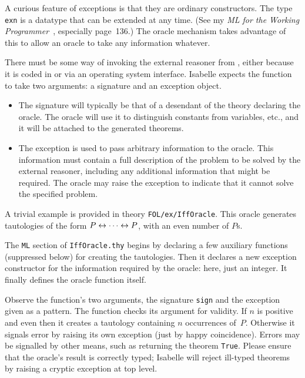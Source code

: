 A curious feature of {\ML} exceptions is that they are ordinary constructors.
The {\ML} type {\tt exn} is a datatype that can be extended at any time.  (See
my {\em {ML} for the Working Programmer}~\cite{paulson-ml2}, especially
page~136.)  The oracle mechanism takes advantage of this to allow an oracle to
take any information whatever.

There must be some way of invoking the external reasoner from \ML, either
because it is coded in {\ML} or via an operating system interface.  Isabelle
expects the {\ML} function to take two arguments: a signature and an
exception object.
\begin{itemize}
\item The signature will typically be that of a desendant of the theory
  declaring the oracle.  The oracle will use it to distinguish constants from
  variables, etc., and it will be attached to the generated theorems.

\item The exception is used to pass arbitrary information to the oracle.  This
  information must contain a full description of the problem to be solved by
  the external reasoner, including any additional information that might be
  required.  The oracle may raise the exception to indicate that it cannot
  solve the specified problem.
\end{itemize}

A trivial example is provided in theory {\tt FOL/ex/IffOracle}.  This
oracle generates tautologies of the form $P\leftrightarrow\cdots\leftrightarrow P$, with
an even number of $P$s.

The \texttt{ML} section of \texttt{IffOracle.thy} begins by declaring
a few auxiliary functions (suppressed below) for creating the
tautologies.  Then it declares a new exception constructor for the
information required by the oracle: here, just an integer. It finally
defines the oracle function itself.
Observe the function's two arguments, the signature {\tt sign} and the
exception given as a pattern.  The function checks its argument for
validity.  If $n$ is positive and even then it creates a tautology
containing $n$ occurrences of~$P$.  Otherwise it signals error by
raising its own exception (just by happy coincidence).  Errors may be
signalled by other means, such as returning the theorem {\tt True}.
Please ensure that the oracle's result is correctly typed; Isabelle
will reject ill-typed theorems by raising a cryptic exception at top
level.

